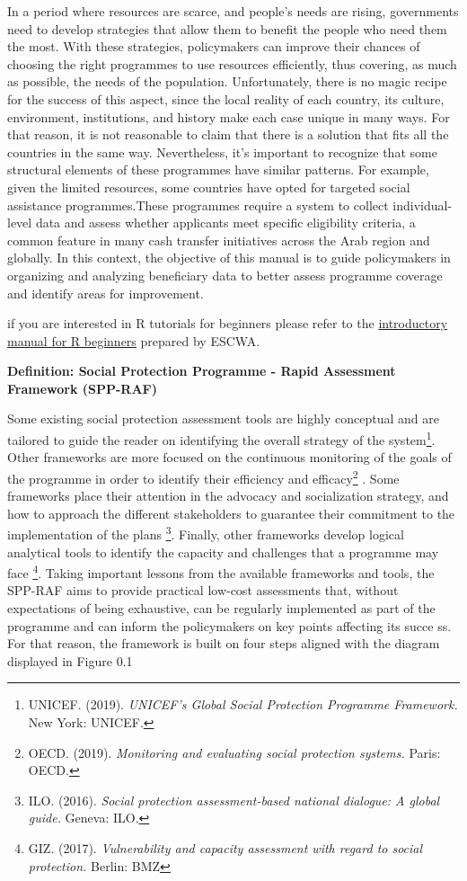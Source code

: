 \documentclass[
]{article}
\begin{document}
In a period where resources are scarce, and people's needs are rising,
governments need to develop strategies that allow them to benefit the
people who need them the most. With these strategies, policymakers can
improve their chances of choosing the right programmes to use resources
efficiently, thus covering, as much as possible, the needs of the
population. Unfortunately, there is no magic recipe for the success of
this aspect, since the local reality of each country, its culture,
environment, institutions, and history make each case unique in many
ways. For that reason, it is not reasonable to claim that there is a
solution that fits all the countries in the same way. Nevertheless, it's
important to recognize that some structural elements of these programmes
have similar patterns. For example, given the limited resources, some
countries have opted for targeted social assistance programmes.These
programmes require a system to collect individual-level data and assess
whether applicants meet specific eligibility criteria, a common feature
in many cash transfer initiatives across the Arab region and globally.
In this context, the objective of this manual is to guide policymakers
in organizing and analyzing beneficiary data to better assess programme
coverage and identify areas for improvement.

if you are interested in R tutorials for beginners please refer to the
\href{https://rpubs.com/ESCWASP/Introduction_R}{introductory manual for
R beginners} prepared by ESCWA.

\textbf{Definition: Social Protection Programme - Rapid Assessment
Framework (SPP-RAF)}

Some existing social protection assessment tools are highly conceptual
and are tailored to guide the reader on identifying the overall strategy
of the system\footnote{UNICEF. (2019). \emph{UNICEF's Global Social
  Protection Programme Framework.} New York: UNICEF.}. Other frameworks
are more focused on the continuous monitoring of the goals of the
programme in order to identify their efficiency and efficacy\footnote{OECD.
  (2019). \emph{Monitoring and evaluating social protection systems.}
  Paris: OECD.} . Some frameworks place their attention in the advocacy
and socialization strategy, and how to approach the different
stakeholders to guarantee their commitment to the implementation of the
plans \footnote{ILO. (2016). \emph{Social protection assessment-based
  national dialogue: A global guide.} Geneva: ILO.}. Finally, other
frameworks develop logical analytical tools to identify the capacity and
challenges that a programme may face \footnote{GIZ. (2017).
  \emph{Vulnerability and capacity assessment with regard to social
  protection.} Berlin: BMZ}. Taking important lessons from the available
frameworks and tools, the SPP-RAF aims to provide practical low-cost
assessments that, without expectations of being exhaustive, can be
regularly implemented as part of the programme and can inform the
policymakers on key points affecting its succe ss. For that reason, the
framework is built on four steps aligned with the diagram displayed in
Figure 0.1
\end{document}
